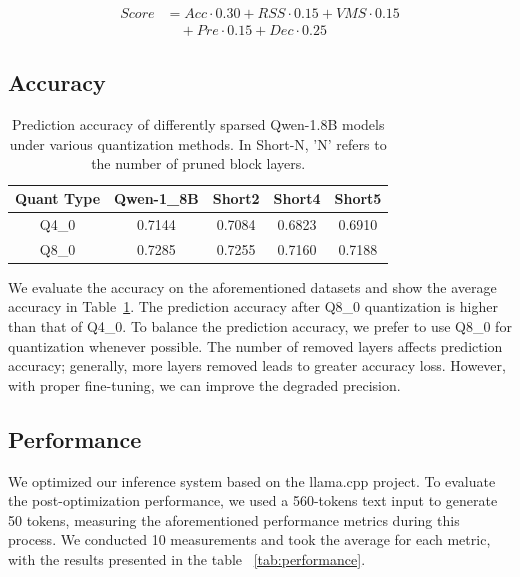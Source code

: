 \documentclass[conference]{IEEEtran}
\begin{document}
\begin{equation}
\begin{split}
Score &= Acc \cdot 0.30 + {{RSS}} \cdot 0.15 + {{VMS}} \cdot 0.15 \\ &\quad  +  {{Pre}} \cdot 0.15 + {{Dec}} \cdot 0.25
\end{split}
\label{eq:score_calc}
\end{equation}

\subsection{Accuracy}\label{4_2}

\begin{table}[htbp]
\caption{Prediction accuracy of differently sparsed Qwen-1.8B models under various quantization methods. In Short-N, 'N' refers to the number of pruned block layers.}
\begin{center}
\begin{tabular}{|c|c|c|c|c|}
\hline
Quant Type & Qwen-1\_8B & Short2 & Short4 & Short5 \\ \hline
Q4\_0    & 0.7144     & 0.7084            & 0.6823            & 0.6910            \\ \hline
Q8\_0    & 0.7285     & 0.7255            & 0.7160            & 0.7188            \\ \hline
\end{tabular}
\label{tab:accuracy}
\end{center}
\end{table}

We evaluate the accuracy on the aforementioned datasets and show the average accuracy in Table~\ref{tab:accuracy}. The prediction accuracy after Q8\_0 quantization is higher than that of Q4\_0. To balance the prediction accuracy, we prefer to use Q8\_0 for quantization whenever possible. The number of removed layers affects prediction accuracy; generally, more layers removed leads to greater accuracy loss. However, with proper fine-tuning, we can improve the degraded precision.

\subsection{Performance}\label{4_3}

We optimized our inference system based on the llama.cpp project. To evaluate the post-optimization performance, we used a 560-tokens text input to generate 50 tokens, measuring the aforementioned performance metrics during this process. We conducted 10 measurements and took the average for each metric, with the results presented in the table ~\ref{tab:performance}.
\end{document}

